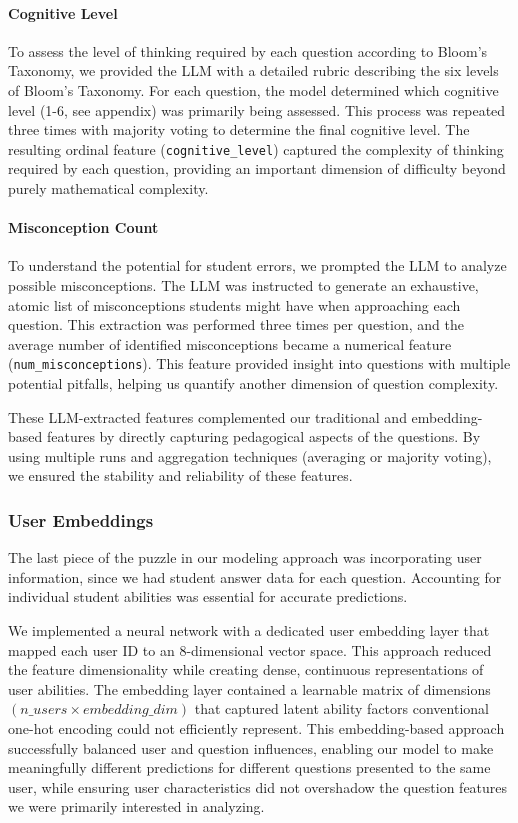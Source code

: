\documentclass[11pt]{article}
\begin{document}
\paragraph{Cognitive Level}
To assess the level of thinking required by each question according to Bloom's Taxonomy, we provided the LLM with a detailed rubric describing the six levels of Bloom's Taxonomy. For each question, the model determined which cognitive level (1-6, see appendix) was primarily being assessed. This process was repeated three times with majority voting to determine the final cognitive level. The resulting ordinal feature (\texttt{cognitive\_level}) captured the complexity of thinking required by each question, providing an important dimension of difficulty beyond purely mathematical complexity.

\paragraph{Misconception Count}
To understand the potential for student errors, we prompted the LLM to analyze possible misconceptions. The LLM was instructed to generate an exhaustive, atomic list of misconceptions students might have when approaching each question. This extraction was performed three times per question, and the average number of identified misconceptions became a numerical feature (\texttt{num\_misconceptions}). This feature provided insight into questions with multiple potential pitfalls, helping us quantify another dimension of question complexity.

These LLM-extracted features complemented our traditional and embedding-based features by directly capturing pedagogical aspects of the questions. By using multiple runs and aggregation techniques (averaging or majority voting), we ensured the stability and reliability of these features.

\subsubsection{User Embeddings}

The last piece of the puzzle in our modeling approach was incorporating user information, since we had student answer data for each question. Accounting for individual student abilities was essential for accurate predictions.

We implemented a neural network with a dedicated user embedding layer that mapped each user ID to an 8-dimensional vector space. This approach reduced the feature dimensionality while creating dense, continuous representations of user abilities. The embedding layer contained a learnable matrix of dimensions $(n\_users \times embedding\_dim)$ that captured latent ability factors conventional one-hot encoding could not efficiently represent. This embedding-based approach successfully balanced user and question influences, enabling our model to make meaningfully different predictions for different questions presented to the same user, while ensuring user characteristics did not overshadow the question features we were primarily interested in analyzing.
\end{document}
